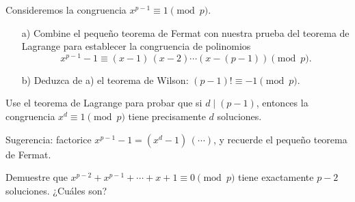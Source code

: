 \documentclass{article}
\begin{document}
\pagebreak

\begin{problema}
  \label{probl:Wilson-2}
  Consideremos la congruencia $x^{p-1} \equiv 1 \pmod{p}$.

  \begin{enumerate}
  \item[a)] Combine el pequeño teorema de Fermat con nuestra prueba del teorema
    de Lagrange para establecer la congruencia de polinomios
    $$x^{p-1} - 1 \equiv (x - 1)\,(x - 2)\cdots (x - (p-1)) \pmod{p}.$$

  \item[b)] Deduzca de a) el teorema de Wilson:
    $(p - 1)! \equiv -1 \pmod{p}$.
  \end{enumerate}
\end{problema}

\begin{problema}
  Use el teorema de Lagrange para probar que si $d \mid (p-1)$, entonces la
  congruencia $x^d \equiv 1 \pmod{p}$ tiene precisamente $d$ soluciones.

  Sugerencia: factorice $x^{p-1} - 1 = (x^d - 1)\,(\cdots)$, y recuerde
  el pequeño teorema de Fermat.
\end{problema}

\begin{problema}
  Demuestre que $x^{p-2} + x^{p-1} + \cdots + x + 1 \equiv 0 \pmod{p}$
  tiene exactamente $p-2$ soluciones. ¿Cuáles son?
\end{problema}
\end{document}
